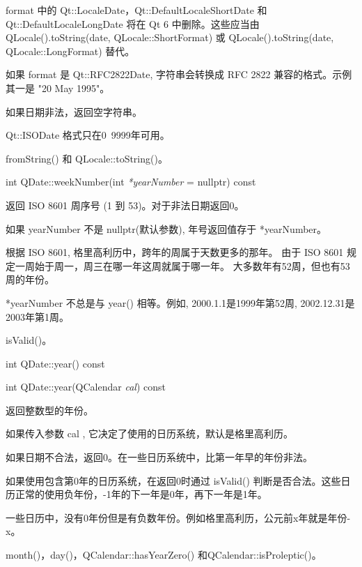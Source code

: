 format 中的 Qt::LocaleDate，Qt::DefaultLocaleShortDate 和Qt::DefaultLocaleLongDate 将在 Qt 6 中删除。这些应当由 QLocale().toString(date, QLocale::ShortFormat) 或 QLocale().toString(date, QLocale::LongFormat) 替代。

如果 format 是 Qt::RFC2822Date, 字符串会转换成 RFC 2822 兼容的格式。示例其一是 "20 May 1995"。

如果日期非法，返回空字符串。

\begin{warning}
Qt::ISODate 格式只在0~9999年可用。
\end{warning}

\begin{seeAlso}
fromString() 和 QLocale::toString()。
\end{seeAlso}


\splitLine

int QDate::weekNumber(int \emph{*yearNumber} = nullptr) const

返回 ISO 8601 周序号 (1 到 53)。对于非法日期返回0。

如果 yearNumber 不是 nullptr(默认参数), 年号返回值存于 *yearNumber。

根据 ISO 8601, 格里高利历中，跨年的周属于天数更多的那年。 由于 ISO 8601 规定一周始于周一，周三在哪一年这周就属于哪一年。 大多数年有52周，但也有53周的年份。

\begin{notice}
 *yearNumber 不总是与 year() 相等。例如, 2000.1.1是1999年第52周, 2002.12.31是2003年第1周。
\end{notice}

\begin{seeAlso}
isValid()。
\end{seeAlso}

\splitLine

int QDate::year() const

int QDate::year(QCalendar \emph{cal}) const

返回整数型的年份。

如果传入参数 cal , 它决定了使用的日历系统，默认是格里高利历。

如果日期不合法，返回0。在一些日历系统中，比第一年早的年份非法。

如果使用包含第0年的日历系统，在返回0时通过 isValid() 判断是否合法。这些日历正常的使用负年份，-1年的下一年是0年，再下一年是1年。

一些日历中，没有0年份但是有负数年份。例如格里高利历，公元前x年就是年份-x。

\begin{seeAlso}
month()，day()，QCalendar::hasYearZero() 和QCalendar::isProleptic()。
\end{seeAlso}

